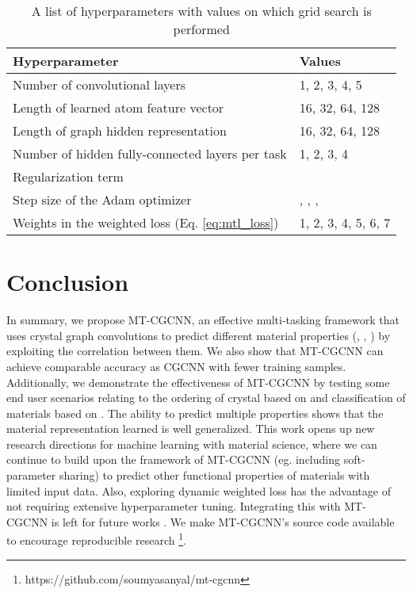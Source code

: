 \documentclass{article}
\newcommand{\method}[1]{MT-CGCNN}
\newcommand{\baseline}[1]{CGCNN}
\newcommand{\proponesym}[1]{}
\newcommand{\proptwosym}[1]{}
\newcommand{\propthreesym}[1]{}
\begin{document}
\begin{table}[h]
	\caption{A list of hyperparameters with values on which grid search is performed}
	\label{table:hyperparam}
	\centering
	\begin{tabular}{ll}
		\toprule
		Hyperparameter 												& Values 										\\
		\midrule
		Number of convolutional layers 								& 1, 2, 3, 4, 5    								\\
		Length of learned atom feature vector  			& 16, 32, 64, 128 								\\
		Length of graph hidden representation						& 16, 32, 64, 128								\\
		Number of hidden fully-connected layers per task 			& 1, 2, 3, 4 									\\
		 Regularization term 									&  						\\
		Step size of the Adam optimizer 							& , , ,  	\\
		Weights in the weighted loss (Eq. \ref{eq:mtl_loss})		& 1, 2, 3, 4, 5, 6, 7							\\
		\bottomrule
	\end{tabular}
\end{table}

\hfill\break
\hfill\break
\hfill\break
\hfill\break
\hfill\break
\hfill\break
\hfill\break


 \section{Conclusion}
\label{sec:conclusion}
In summary, we propose \method{}, an effective multi-tasking framework that uses crystal graph convolutions to predict different material properties (\proponesym{}, \proptwosym{}, \propthreesym{}) by exploiting the correlation between them. We also show that \method{} can achieve comparable accuracy as \baseline{} with fewer training samples. Additionally, we demonstrate the effectiveness of \method{} by testing some end user scenarios relating to the ordering of crystal based on \proponesym{} and classification of materials based on \proptwosym{}. The ability to predict multiple properties shows that the material representation learned is well generalized. This work opens up new research directions for machine learning with material science, where we can continue to build upon the framework of \method{} (eg. including soft-parameter sharing) to predict other functional properties of materials with limited input data. Also, exploring dynamic weighted loss has the advantage of not requiring extensive hyperparameter tuning. Integrating this with \method{} is left for future works \citep{Gradnorm17, KendallGC17}. We make \method{}’s source code available to encourage reproducible research \footnote{https://github.com/soumyasanyal/mt-cgcnn}.
\end{document}
